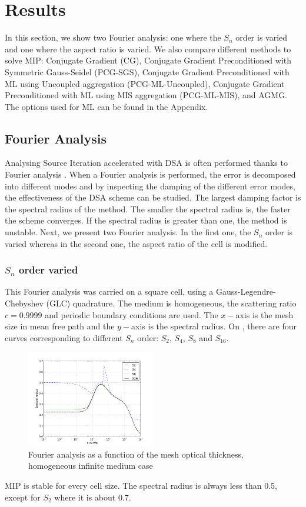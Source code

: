 \section{Results} \label{sec_res}
In this section, we show two Fourier analysis: one where the $S_n$ order is
varied and one where the aspect ratio is varied. We also compare different
methods to solve MIP: Conjugate Gradient (CG), Conjugate Gradient
Preconditioned with Symmetric Gauss-Seidel (PCG-SGS), Conjugate Gradient
Preconditioned with ML using Uncoupled aggregation (PCG-ML-Uncoupled),
Conjugate Gradient Preconditioned with ML using MIS aggregation (PCG-ML-MIS),
and AGMG. The options used for ML can be found in the Appendix.
\subsection{Fourier Analysis}
Analysing Source Iteration accelerated with DSA is often performed thanks to
Fourier analysis \cite{larsen_dsa,consistent_p1}. When a Fourier analysis is
performed, the error is decomposed into different modes and by inspecting the 
damping of the different error modes, the effectiveness of the DSA scheme can 
be studied. The largest damping factor is the spectral radius of the method. 
The smaller
the spectral radius is, the faster the scheme converges. If the spectral
radius is greater than one, the method is unstable. Next, we present two Fourier 
analysis. In the first one, the $S_n$ order is varied whereas in the second one, 
the aspect ratio of the cell is modified.
\subsubsection{$S_n$ order varied}
This Fourier analysis was carried on a square cell, using a
Gauss-Legendre-Chebyshev (GLC) quadrature. The medium is homogeneous, the scattering
ratio $c=0.9999$ and periodic boundary conditions are used. The $x-$axis is the mesh
size in mean free path and the $y-$axis is the spectral radius. On
, there are four curves corresponding to different $S_n$
order: $S_2$, $S_4$, $S_8$ and $S_{16}$.
\begin{figure}[H]
  \centering
  \includegraphics[width=0.5\textwidth]{sn_order_9999}
  \caption{Fourier analysis as a function of the mesh optical thickness,
  homogeneous infinite medium case}
  \label{fig_fa_sn}
\end{figure}
MIP is stable for every cell size. The spectral radius is always less than
0.5, except for $S_2$ where it is about 0.7.

